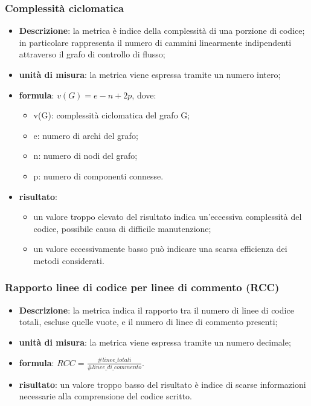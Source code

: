 	\subsubsection*{Complessità ciclomatica}
	\begin{itemize}
		\item{\textbf{Descrizione}}: la metrica è indice della complessità di una porzione di codice;  in particolare rappresenta il numero di cammini linearmente indipendenti attraverso il grafo di controllo di flusso;
		\item{\textbf{unità di misura}}: la metrica viene espressa tramite un numero intero;
		\item{\textbf{formula}}: $ v(G) = e - n + 2p $, dove:
			\begin{itemize}
				\item{v(G)}: complessità ciclomatica del grafo G;
				\item{e}: numero di archi del grafo;
				\item{n}: numero di nodi del grafo;
				\item{p}: numero di componenti connesse.
			\end{itemize}
		\item{\textbf{risultato}}:
			\begin{itemize}
				\item un valore troppo elevato del risultato indica un'eccessiva complessità del codice, possibile causa di difficile manutenzione;
				\item un valore eccessivamente basso può indicare una scarsa efficienza dei metodi considerati.
			\end{itemize}
	\end{itemize}

	\subsubsection*{Rapporto linee di codice per linee di commento (RCC)}
	\begin{itemize}
		\item{\textbf{Descrizione}}: la metrica indica il rapporto tra il numero di linee di codice totali, escluse quelle vuote, e il numero di linee di commento presenti;
		\item{\textbf{unità di misura}}: la metrica viene espressa tramite un numero decimale;
		\item{\textbf{formula}}: $ RCC = \displaystyle\frac{\#linee\_totali}{\#linee\_di\_commento} $.
		\item{\textbf{risultato}}: un valore troppo basso del risultato è indice di scarse informazioni necessarie alla comprensione del codice scritto.
	\end{itemize}

